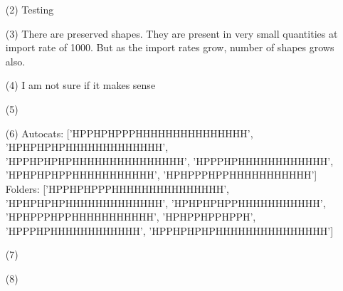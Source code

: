 \documentclass[journal=jacsat,manuscript=article,layout=twocolumn]{achemso}
\begin{document}
\begin{enumerate}
 \item [(2)] Testing
 \item [(3)] There are preserved shapes. They are present in very small quantities at import rate 
of 1000. But as the import rates grow, number of shapes grows also.
 \item [(4)] I am not sure if it makes sense
 \item [(5)]
 \item [(6)]Autocats: ['HPPHPHPPPHHHHHHHHHHHHHHH', 'HPHPHPHPHHHHHHHHHHHHH', 
'HPPHPHPHPHHHHHHHHHHHHHHH', 'HPPPHPHHHHHHHHHHHH', 'HPHPHPHPPHHHHHHHHHHH', 'HPHPPPHPPHHHHHHHHHHH']\\
Folders: ['HPPHPHPPPHHHHHHHHHHHHHHH', 'HPHPHPHPHHHHHHHHHHHHH', 'HPHPHPHPPHHHHHHHHHHH', 
'HPHPPPHPPHHHHHHHHHHH', 'HPHPPHPPHPPH', 'HPPPHPHHHHHHHHHHHH', 'HPPHPHPHPHHHHHHHHHHHHHHH']

 \item [(7)]
 \item [(8)]
\end{enumerate}
 
\end{document}

